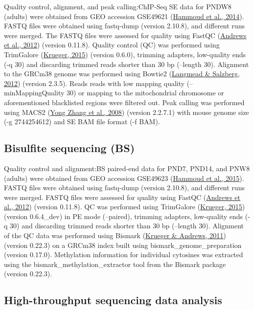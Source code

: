 \documentclass[12pt,twoside]{reedthesis}
\begin{document}
Quality control, alignment, and peak calling:ChIP-Seq SE data for PNDW8
(adults) were obtained from GEO accession GSE49621 (\protect\hyperlink{ref-hammoud2014}{Hammoud et al., 2014}). FASTQ
files were obtained using fastq-dump (version 2.10.8), and different
runs were merged. The FASTQ files were assessed for quality using FastQC
(\protect\hyperlink{ref-andrews2012}{Andrews et al., 2012}) (version 0.11.8). Quality control (QC) was performed
using TrimGalore (\protect\hyperlink{ref-krueger2015}{Krueger, 2015}) (version 0.6.0), trimming adapters,
low-quality ends (-q 30) and discarding trimmed reads shorter than 30 bp
(--length 30). Alignment to the GRCm38 genome was performed using
Bowtie2 (\protect\hyperlink{ref-langmead2012}{Langmead \& Salzberg, 2012}) (version 2.3.5). Reads reads with low mapping
quality (--minMappingQuality 30) or mapping to the mitochondrial
chromosome or aforementioned blacklisted regions were filtered out. Peak
calling was performed using MACS2 (\protect\hyperlink{ref-zhang2008}{Yong Zhang et al., 2008}) (version 2.2.7.1) with
mouse genome size (-g 2744254612) and SE BAM file format (-f BAM).

\hypertarget{bisulfite-sequencing-bs}{%
\subsection{Bisulfite sequencing (BS)}\label{bisulfite-sequencing-bs}}

Quality control and alignment:BS paired-end data for PND7, PND14, and
PNW8 (adults) were obtained from GEO accession GSE49623 (\protect\hyperlink{ref-hammoud2015}{Hammoud et al., 2015}).
FASTQ files were obtained using fastq-dump (version 2.10.8), and
different runs were merged. FASTQ files were assessed for quality using
FastQC (\protect\hyperlink{ref-andrews2012}{Andrews et al., 2012}) (version 0.11.8). QC was performed using
TrimGalore (\protect\hyperlink{ref-krueger2015}{Krueger, 2015}) (version 0.6.4\_dev) in PE mode (--paired),
trimming adapters, low-quality ends (-q 30) and discarding trimmed reads
shorter than 30 bp (--length 30). Alignment of the QC data was performed
using Bismark (\protect\hyperlink{ref-krueger2011}{Krueger \& Andrews, 2011}) (version 0.22.3) on a GRCm38 index built
using bismark\_genome\_preparation (version 0.17.0). Methylation
information for individual cytosines was extracted using the
bismark\_methylation\_extractor tool from the Bismark package (version
0.22.3).

\hypertarget{high-throughput-sequencing-data-analysis}{%
\subsection{High-throughput sequencing data analysis}\label{high-throughput-sequencing-data-analysis}}
\end{document}

